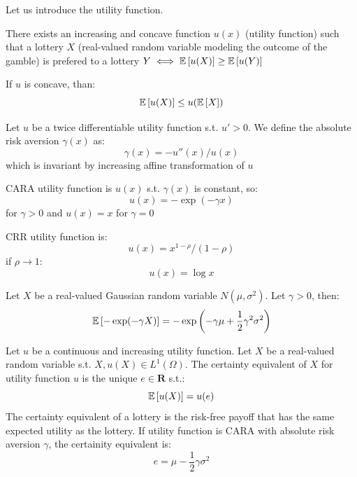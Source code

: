 Let us introduce the utility function.
\begin{mydefinition}
	There exists an increasing and concave function $u(x)$ (utility function) such that a lottery $X$ (real-valued random variable modeling the outcome of the gamble) is prefered to a lottery $Y \iff \mathbb{E}\left[u(X)\right] \geq \mathbb{E}\left[u(Y)\right]$  
\end{mydefinition}
\begin{mytheorem}
	If $u$ is concave, than:
	\[
	\mathbb{E}\left[u(X)\right] \leq u(\mathbb{E}\left[X\right])
	\]
\end{mytheorem}
\begin{mydefinition}
	Let $u$ be a twice differentiable utility function s.t. $u'>0$. We define the absolute risk aversion $\gamma(x)$ as:
	\[
	\gamma(x) = -u''(x)/u(x)
	\]
	which is invariant by increasing affine transformation of $u$
\end{mydefinition}
\begin{mydefinition}
CARA utility function is $u(x)$ s.t. $\gamma(x)$ is constant, so:
\[
u(x) = -\exp(-\gamma x)
\]
for $\gamma >0$ and $u(x) =x$ for $\gamma = 0$
\end{mydefinition}
\begin{mydefinition}
CRR utility function is:
\[
u(x)= x^{1-\rho}/(1-\rho)
\]
if $\rho \to 1$:
\[
u(x) = \log x
\]
\end{mydefinition}
\newpage
\begin{mytheorem}
	Let $X$ be a real-valued Gaussian random variable $N(\mu, \sigma^2)$. Let $\gamma >0$, then:
	\[
	\mathbb{E}\left[-\exp(-\gamma X)\right] = -\exp\left(-\gamma \mu + \frac{1}{2}\gamma^2\sigma^2\right)
	\]
\end{mytheorem}
\begin{mydefinition}
	Let $u$ be a continuous and increasing utility function. Let $X$ be a real-valued random variable s.t. $X,u(X) \in L^1(\Omega)$. The certainty equivalent of $X$ for utility function $u$ is the unique $e\in \mathbf{R}$ s.t.:
	\[
	\mathbb{E}\left[u(X)\right]=u(e)
	\]
	The certainty equivalent of a lottery is the risk-free payoff that has the same expected utility as the lottery.
If utility function is CARA with absolute risk aversion $\gamma$, the certainity equivalent is:
\[
e = \mu - \frac{1}{2}\gamma\sigma^2
\]
\end{mydefinition}
